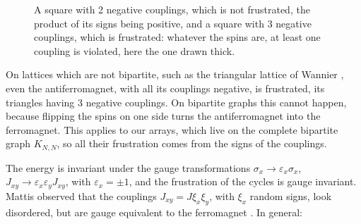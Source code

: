 \documentclass[11pt,a4paper]{article}
\theoremstyle{remark}
\begin{document}
\begin{figure}[htb!]
\centering
{}
\caption{A square with 2 negative couplings, which is not frustrated, the product of its signs being positive, and a square with 3 negative couplings, which is frustrated: whatever the spins are, at least one coupling is violated, here the one drawn thick.}\label{fig:frustmore}
\end{figure}

On lattices which are not bipartite, such as the triangular lattice of Wannier \cite{wan}, even the antiferromagnet, with all its couplings negative, is frustrated, its triangles having 3 negative couplings. On bipartite graphs this cannot happen, because flipping the spins on one side turns the antiferromagnet into the ferromagnet. This applies to our arrays, which live on the complete bipartite graph $K_{N,N}$, so all their frustration comes from the signs of the couplings.

The energy is invariant under the gauge transformations $\sigma_x\to\varepsilon_x\sigma_x$, $J_{xy}\to\varepsilon_x\varepsilon_yJ_{xy}$, with $\varepsilon_x=\pm1$, and the frustration of the cycles is gauge invariant. Mattis observed that the couplings $J_{xy}=J\xi_x\xi_y$, with $\xi_x$ random signs, look disordered, but are gauge equivalent to the ferromagnet \cite{mat}. In general:
\end{document}
